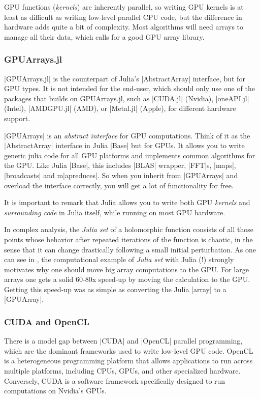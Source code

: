 GPU functions (\emph{kernels}) are inherently parallel, so writing GPU kernels is at least as difficult as writing low-level parallel CPU code, but the difference in hardware adds quite a bit of complexity. Most algorithms will need arrays to manage all their data, which calls for a good GPU array library.


\subsubsection*{GPUArrays.jl}

|GPUArrays.jl| is the counterpart of Julia's |AbstractArray| interface, but for GPU types. It is not intended for the end-user, which should only use one of the packages that builds on GPUArrays.jl, such as |CUDA.jl| (Nvidia), |oneAPI.jl| (Intel), |AMDGPU.jl| (AMD), or |Metal.jl| (Apple), for different hardware support.


|GPUArrays| is an \emph{abstract interface} for GPU computations. Think of it as the |AbstractArray| interface in Julia |Base| but for GPUs. It allows you to write generic julia code for all GPU platforms and implements common algorithms for the GPU. Like Julia |Base|, this includes |BLAS| wrapper, |FFT|s, |maps|, |broadcasts| and m|apreduces|. So when you inherit from |GPUArrays| and overload the interface correctly, you will get a lot of functionality for free.

It is important to remark that 
Julia allows you to write both GPU \emph{kernels} and \emph{surrounding code} in Julia itself, while running on most GPU hardware. 

In complex analysis, the \emph{Julia set} \cite{juliaset} of a holomorphic function consists of all those points whose behavior after repeated iterations of the function is chaotic, in the sense that it can change drastically following a small initial perturbation.
As one can see in \cite{JuliaGPU}, the computational example of \emph{Julia set} with Julia (!) strongly motivates why one should move big array computations to the GPU. For large arrays one gets a solid 60-80x speed-up by moving the calculation to the GPU. Getting this speed-up was as simple as converting the Julia |array| to a |GPUArray|.


\subsubsection*{CUDA and OpenCL}

There is a model gap between |CUDA| and |OpenCL| parallel programming, which are the dominant frameworks used to write low-level GPU code. OpenCL is a heterogeneous programming platform that allows applications to run across multiple platforms, including CPUs, GPUs, and other specialized hardware. Conversely, CUDA is a software framework specifically designed to run computations on Nvidia's GPUs.

